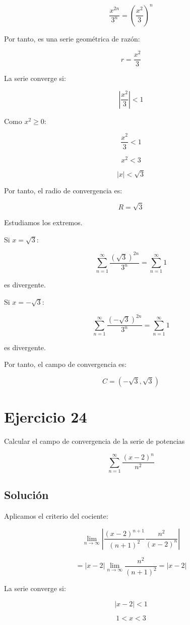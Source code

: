\documentclass[fleqn]{article}
\begin{document}
	\[
	\frac{x^{2n}}{3^n}
	=
	\left(
	\frac{x^2}{3}
	\right)^n
	\]

	Por tanto, es una serie geométrica de razón:

	\[
	r=\frac{x^2}{3}
	\]

	La serie converge si:

	\[
	\left|
	\frac{x^2}{3}
	\right|<1
	\]

	Como $x^2\geq0$:

	\[
	\frac{x^2}{3}<1
	\]

	\[
	x^2<3
	\]

	\[
	|x|<\sqrt{3}
	\]

	Por tanto, el radio de convergencia es:

	\[
	\boxed{
	R=\sqrt{3}
	}
	\]

	Estudiamos los extremos.

	Si $x=\sqrt{3}$:

	\[
	\sum_{n=1}^{\infty}
	\frac{(\sqrt{3})^{2n}}{3^n}
	=
	\sum_{n=1}^{\infty}1
	\]

	es divergente.

	Si $x=-\sqrt{3}$:

	\[
	\sum_{n=1}^{\infty}
	\frac{(-\sqrt{3})^{2n}}{3^n}
	=
	\sum_{n=1}^{\infty}1
	\]

	es divergente.

	Por tanto, el campo de convergencia es:

	\[
	\boxed{
	C=(-\sqrt{3},\sqrt{3})
	}
	\]

\section{Ejercicio 24}
	Calcular el campo de convergencia de la serie de potencias

	\[
	\sum_{n=1}^{\infty}
	\frac{(x-2)^n}{n^2}
	\]

	\subsection{Solución}

	Aplicamos el criterio del cociente:

	\[
	\lim_{n\to\infty}
	\left|
	\frac{(x-2)^{n+1}}{(n+1)^2}
	\frac{n^2}{(x-2)^n}
	\right|
	\]

	\[
	=
	|x-2|
	\lim_{n\to\infty}
	\frac{n^2}{(n+1)^2}
	=
	|x-2|
	\]

	La serie converge si:

	\[
	|x-2|<1
	\]

	\[
	1<x<3
	\]
\end{document}
